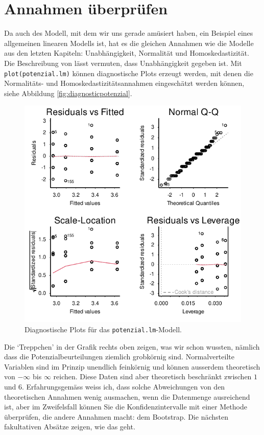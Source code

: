 \documentclass[oneside, 10pt]{book}\usepackage[]{graphicx}\usepackage[]{xcolor}
\newenvironment{knitrout}{}{} %
\begin{document}
\section{Annahmen überprüfen}
Da auch des Modell, mit dem wir uns gerade amüsiert haben, 
ein Beispiel eines allgemeinen linearen Modells ist,
hat es die gleichen Annahmen wie die Modelle aus den letzten Kapiteln:
Unabhängigkeit, Normalität und Homoskedastizität. Die Beschreibung
von \citet{Berthele2011b} lässt vermuten, dass Unabhängigkeit gegeben ist.
Mit \texttt{plot(potenzial.lm)}
können diagnostische Plots erzeugt werden, mit denen die Normalitäts- und
Homoskedastizitätsannahmen eingeschätzt werden können, 
siehe Abbildung \ref{fig:diagnosticpotenzial}.
\begin{knitrout}
\color{fgcolor}\begin{figure}[tp]

{\centering \includegraphics[width=.7\textwidth]{figs/unnamed-chunk-288-1} 

}

\caption{Diagnostische Plots für das \texttt{potenzial.lm}-Modell.\label{fig:diagnosticpotenzial}}\label{fig:unnamed-chunk-288}
\end{figure}

\end{knitrout}

Die `Treppchen' in der Grafik rechts oben zeigen, was wir schon wussten,
nämlich dass die Potenzialbeurteilungen ziemlich grobkörnig sind.
Normalverteilte Variablen sind im Prinzip unendlich feinkörnig und können
ausserdem theoretisch von $-\infty$ bis $\infty$ reichen. Diese Daten
sind aber theoretisch beschränkt zwischen $1$ und $6$.
Erfahrungsgemäss weiss ich, dass solche Abweichungen von den theoretischen
Annahmen wenig ausmachen, wenn die Datenmenge ausreichend ist,
aber im Zweifelsfall können Sie die Konfidenzintervalle mit einer
Methode überprüfen, die andere Annahmen macht: dem Bootstrap.
Die nächsten fakultativen Absätze zeigen, wie das geht.
\end{document}
